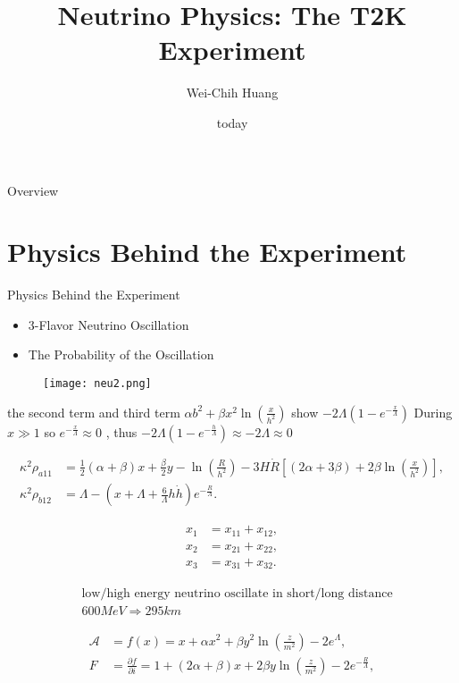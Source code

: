 \documentclass{beamer}
\title[T2K Experiment]{Neutrino Physics: The T2K Experiment}
\author{Wei-Chih Huang}
\institute[NTHU]{
National Tsing Hua University \\
\medskip
}
\date{today}
\begin{document}
\begin{frame}
	\titlepage %
\end{frame}
\begin{frame}{Overview}
	\tableofcontent
\end{frame}

\section{Physics Behind the Experiment}

\begin{frame}{Physics Behind the Experiment}
	\begin{itemize}
		\item 3-Flavor Neutrino Oscillation
		\item The Probability of the Oscillation
	\end{itemize}
	\begin{figure}[h]
		\texttt{[image: neu2.png]}
	\end{figure}
\end{frame}

the second term and third term
$\alpha b^2 + \beta x^2 \ln(\frac{x}{h^2})$ show $- 2 \Lambda(1 - e^{-\frac{x}{\Lambda}})$
\cite{Odintsov:2017qif}
During $x\gg1$ so $e^{-\frac{x}{\Lambda}} \approx 0$ , thus $- 2 \Lambda(1 - e^{-\frac{h}{\Lambda}}) \approx -2 \Lambda \approx 0 $

\begin{align}
	\kappa^2 \rho_{a11}
	& = \frac{1}{2}(\alpha+\beta)x + \frac{\beta}{2} y - \ln(\frac{R}{h^2}) - 3H\dot{R}
	\left[
	(2\alpha + 3\beta) + 2\beta \ln(\frac{x}{h^2})
	\right],
	\\
	\kappa^2 \rho_{b12}
	& = \Lambda -
	\left(
	x + \Lambda + \frac{6}{\Lambda}h\dot{h}
	\right)
	e^{-\frac{R}{\Lambda}}.
\end{align}

\begin{align}
	x_1 & = x_{11} + x_{12},
	\\
	x_2 & = x_{21} + x_{22},
	\\
	x_3 & = x_{31} + x_{32}.
\end{align}


\begin{align*}
	& \text{low/high energy neutrino oscillate in short/long distance}
	\\
	& 600 MeV \Rightarrow 295 km
\end{align*}

\begin{align}
	\mathscr{A} & = f(x) = x + \alpha x^2 + \beta y^2 \ln(\frac{z}{m^2})- 2 e^{\Lambda}\label{fr},
	\\
	F           & = \frac{\partial f}{\partial i}= 1 + (2\alpha + \beta)x + 2\beta y \ln(\frac{z}{m^2}) - 2e^{-\frac{R}{\Lambda}},
\end{align}
\end{document}
